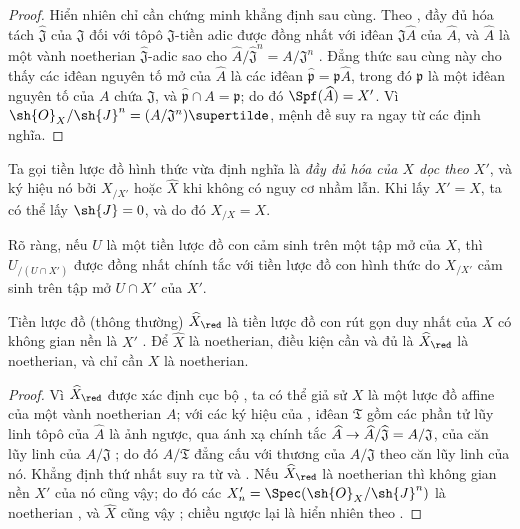 \documentclass[oneside]{amsart}
\makeatletter
\newcommand{\ega@arrow}[2]{\mathchoice{#1}{#2}{#2}{#2}}
\renewcommand{\to}{\ega@arrow{\longrightarrow}{\rightarrow}}
\newcommand{\oldpage}[2][]{{\marginnote{\normalfont\textbf{#1}~|~#2}}\ignorespaces}
\let\EGAOriginalLabel\label
\renewcommand{\label}[1]{\phantomsection\EGAOriginalLabel{#1}}
\makeatother
\begin{document}
\begin{proof}
Hiển nhiên chỉ cần chứng minh khẳng định sau cùng.
Theo , đầy đủ hóa tách $\widehat{\mathfrak{J}}$ của $\mathfrak{J}$ đối với tôpô $\mathfrak{J}$-tiền adic được đồng nhất với iđêan $\mathfrak{J}\widehat{A}$ của $\widehat{A}$, và $\widehat{A}$ là một vành noetherian $\widehat{\mathfrak{J}}$-adic sao cho $\widehat{A}/\widehat{\mathfrak{J}}^n=A/\mathfrak{J}^n$ .
Đẳng thức sau cùng này cho thấy các iđêan nguyên tố mở của $\widehat{A}$ là các iđêan $\widehat{\mathfrak{p}}=\mathfrak{p}\widehat{A}$, trong đó $\mathfrak{p}$ là một iđêan nguyên tố của $A$ chứa $\mathfrak{J}$, và $\widehat{\mathfrak{p}}\cap A=\mathfrak{p}$; do đó $\Spf(\widehat{A})=X'$.
Vì $\sh{O}_X/\sh{J}^n=(A/\mathfrak{J}^n)\supertilde$, mệnh đề suy ra ngay từ các định nghĩa.
\end{proof}

Ta gọi tiền lược đồ hình thức vừa định nghĩa là \emph{đầy đủ hóa của $X$ dọc theo $X'$}, và ký hiệu nó bởi $X_{/X'}$ hoặc $\widehat{X}$ khi không có nguy cơ nhầm lẫn.
Khi lấy $X'=X$, ta có thể lấy $\sh{J}=0$, và do đó $X_{/X}=X$.

Rõ ràng, nếu $U$ là một tiền lược đồ con cảm sinh trên một tập mở của $X$, thì $U_{/(U\cap X')}$ được đồng nhất chính tắc với tiền lược đồ con hình thức do $X_{/X'}$ cảm sinh trên tập mở $U\cap X'$ của $X'$.

\begin{corollary}[10.8.6]
\label{I.10.8.6}
Tiền lược đồ (thông thường) $\widehat{X}_\red$ là tiền lược đồ con rút gọn duy nhất của $X$ có không gian nền là $X'$ .
Để $\widehat{X}$ là noetherian, điều kiện cần và đủ là $\widehat{X}_\red$ là noetherian, và chỉ cần $X$ là noetherian.
\end{corollary}

\oldpage[I]{196}

\begin{proof}
Vì $\widehat{X}_\red$ được xác định cục bộ , ta có thể giả sử $X$ là một lược đồ affine của một vành noetherian $A$; với các ký hiệu của , iđêan $\mathfrak{T}$ gồm các phần tử lũy linh tôpô của $\widehat{A}$ là ảnh ngược, qua ánh xạ chính tắc $\widehat{A}\to\widehat{A}/\widehat{\mathfrak{J}}=A/\mathfrak{J}$, của căn lũy linh của $A/\mathfrak{J}$ ; do đó $\widehat{A}/\mathfrak{T}$ đẳng cấu với thương của $A/\mathfrak{J}$ theo căn lũy linh của nó.
Khẳng định thứ nhất suy ra từ  và .
Nếu $\widehat{X}_\red$ là noetherian thì không gian nền $X'$ của nó cũng vậy; do đó các $X_n'=\Spec(\sh{O}_X/\sh{J}^n)$ là noetherian , và $\widehat{X}$ cũng vậy ; chiều ngược lại là hiển nhiên theo .
\end{proof}
\end{document}
